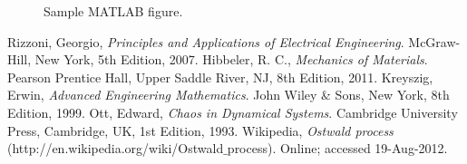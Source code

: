 \documentclass{article}
\begin{document}
\begin{figure}[htb]
\begin{center}
\caption{Sample MATLAB figure.}
\end{center}
\end{figure}
\pagebreak

\begin{thebibliography}{9}
Rizzoni, Georgio,
{\it Principles and Applications of Electrical Engineering}.
McGraw-Hill, New York,
5th Edition,
2007.
Hibbeler, R. C.,
{\it Mechanics of Materials}.
Pearson Prentice Hall, Upper Saddle River, NJ, 8th Edition, 2011.
Kreyszig, Erwin,
{\it Advanced Engineering Mathematics}.
John Wiley \& Sons, New York, 8th Edition, 1999.
Ott, Edward,
{\it Chaos in Dynamical Systems}.
Cambridge University Press, Cambridge, UK, 1st Edition, 1993.
Wikipedia, 
{\it Ostwald process} (http://en.wikipedia.org/wiki/Ostwald$\_$process).
Online; accessed 19-Aug-2012.
\end{thebibliography}
\end{document}
